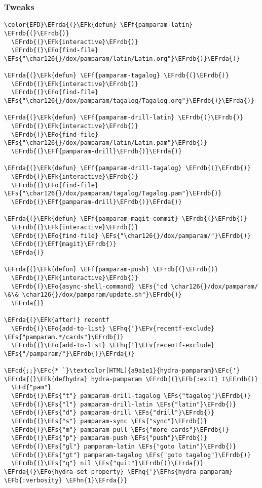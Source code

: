 \documentclass[a4wide,10pt]{article}
\newcommand{\EFc}[1]{\textcolor{EFc}{#1}} %
\newcommand{\EFcd}[1]{\textcolor{EFcd}{#1}} %
\newcommand{\EFs}[1]{\textcolor{EFs}{#1}} %
\newcommand{\EFd}[1]{\textcolor{EFd}{#1}} %
\newcommand{\EFk}[1]{\textcolor{EFk}{#1}} %
\newcommand{\EFb}[1]{\textcolor{EFb}{#1}} %
\newcommand{\EFf}[1]{\textcolor{EFf}{#1}} %
\newcommand{\EFv}[1]{\textcolor{EFv}{#1}} %
\newcommand{\EFo}[1]{\textcolor{EFo}{#1}} %
\newcommand{\EFhn}[1]{\textcolor{EFhn}{\textbf{#1}}} %
\newcommand{\EFhq}[1]{\textcolor{EFhq}{#1}} %
\newcommand{\EFhs}[1]{\textcolor{EFhs}{#1}} %
\newcommand{\EFrda}[1]{\textcolor{EFrda}{#1}} %
\newcommand{\EFrdb}[1]{\textcolor{EFrdb}{#1}} %
\begin{document}
\subsubsection{Tweaks}
\label{sec:org5377414}
\begin{Code}
\begin{Verbatim}
\color{EFD}\EFrda{(}\EFk{defun} \EFf{pamparam-latin} \EFrdb{(}\EFrdb{)}
  \EFrdb{(}\EFk{interactive}\EFrdb{)}
  \EFrdb{(}\EFo{find-file} \EFs{"\char126{}/dox/pamparam/latin/Latin.org"}\EFrdb{)}\EFrda{)}

\EFrda{(}\EFk{defun} \EFf{pamparam-tagalog} \EFrdb{(}\EFrdb{)}
  \EFrdb{(}\EFk{interactive}\EFrdb{)}
  \EFrdb{(}\EFo{find-file} \EFs{"\char126{}/dox/pamparam/tagalog/Tagalog.org"}\EFrdb{)}\EFrda{)}

\EFrda{(}\EFk{defun} \EFf{pamparam-drill-latin} \EFrdb{(}\EFrdb{)}
  \EFrdb{(}\EFk{interactive}\EFrdb{)}
  \EFrdb{(}\EFo{find-file} \EFs{"\char126{}/dox/pamparam/latin/Latin.pam"}\EFrdb{)}
  \EFrdb{(}\EFf{pamparam-drill}\EFrdb{)}\EFrda{)}

\EFrda{(}\EFk{defun} \EFf{pamparam-drill-tagalog} \EFrdb{(}\EFrdb{)}
  \EFrdb{(}\EFk{interactive}\EFrdb{)}
  \EFrdb{(}\EFo{find-file} \EFs{"\char126{}/dox/pamparam/tagalog/Tagalog.pam"}\EFrdb{)}
  \EFrdb{(}\EFf{pamparam-drill}\EFrdb{)}\EFrda{)}

\EFrda{(}\EFk{defun} \EFf{pamparam-magit-commit} \EFrdb{(}\EFrdb{)}
  \EFrdb{(}\EFk{interactive}\EFrdb{)}
  \EFrdb{(}\EFo{find-file} \EFs{"\char126{}/dox/pamparam/"}\EFrdb{)}
  \EFrdb{(}\EFf{magit}\EFrdb{)}
  \EFrda{)}

\EFrda{(}\EFk{defun} \EFf{pamparam-push} \EFrdb{(}\EFrdb{)}
  \EFrdb{(}\EFk{interactive}\EFrdb{)}
  \EFrdb{(}\EFo{async-shell-command} \EFs{"cd \char126{}/dox/pamparam/ \&\& \char126{}/dox/pamparam/update.sh"}\EFrdb{)}
  \EFrda{)}

\EFrda{(}\EFk{after!} recentf
  \EFrdb{(}\EFo{add-to-list} \EFhq{'}\EFv{recentf-exclude} \EFs{"pamparam.*/cards"}\EFrdb{)}
  \EFrdb{(}\EFo{add-to-list} \EFhq{'}\EFv{recentf-exclude} \EFs{"/pamparam/"}\EFrdb{)}\EFrda{)}

\EFcd{;;}\EFc{* `}\textcolor[HTML]{a9a1e1}{hydra-pamparam}\EFc{'}
\EFrda{(}\EFk{defhydra} hydra-pamparam \EFrdb{(}\EFb{:exit} t\EFrdb{)}
  \EFd{"pam"}
  \EFrdb{(}\EFs{"t"} pamparam-drill-tagalog \EFs{"tagalog"}\EFrdb{)}
  \EFrdb{(}\EFs{"l"} pamparam-drill-latin \EFs{"latin"}\EFrdb{)}
  \EFrdb{(}\EFs{"d"} pamparam-drill \EFs{"drill"}\EFrdb{)}
  \EFrdb{(}\EFs{"s"} pamparam-sync \EFs{"sync"}\EFrdb{)}
  \EFrdb{(}\EFs{"m"} pamparam-pull \EFs{"more cards"}\EFrdb{)}
  \EFrdb{(}\EFs{"p"} pamparam-push \EFs{"push"}\EFrdb{)}
  \EFrdb{(}\EFs{"gl"} pamparam-latin \EFs{"goto latin"}\EFrdb{)}
  \EFrdb{(}\EFs{"gt"} pamparam-tagalog \EFs{"goto tagalog"}\EFrdb{)}
  \EFrdb{(}\EFs{"q"} nil \EFs{"quit"}\EFrdb{)}\EFrda{)}
\EFrda{(}\EFo{hydra-set-property} \EFhq{'}\EFhs{hydra-pamparam} \EFb{:verbosity} \EFhn{1}\EFrda{)}


\end{Verbatim}
\end{Code}
\end{document}
